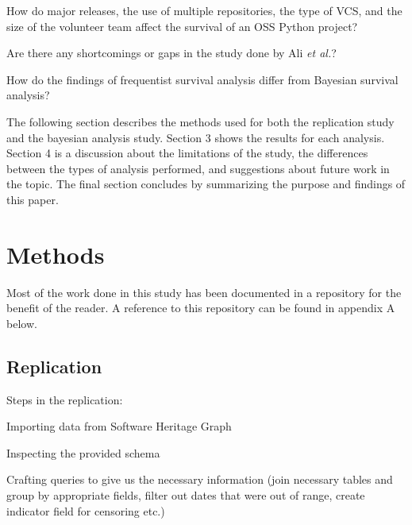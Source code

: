 \documentclass[acmconf]{acmart}
\begin{document}
\begin{questions}
    \item How do major releases, the use of multiple repositories, the type of VCS, and the size of the volunteer team affect the survival of an OSS Python project?
    \item Are there any shortcomings or gaps in the study done by Ali \emph{et al.}?
    \item How do the findings of frequentist survival analysis differ from Bayesian survival analysis?
\end{questions}

The following section describes the methods used for both the replication study and the bayesian analysis study.
Section 3 shows the results for each analysis.
Section 4 is a discussion about the limitations of the study, the differences between the types of analysis performed, and suggestions about future work in the topic.
The final section concludes by summarizing the purpose and findings of this paper. 

\section{Methods}

Most of the work done in this study has been documented in a repository for the benefit of the reader.
A reference to this repository  can be found in appendix A below. 

\subsection{Replication}


Steps in the replication:

Importing data from Software Heritage Graph \cite{pietri2019software}

Inspecting the provided schema

Crafting queries to give us the necessary information (join necessary tables and group by appropriate fields, filter out dates that were out of range, create indicator field for censoring etc.)
\end{document}

